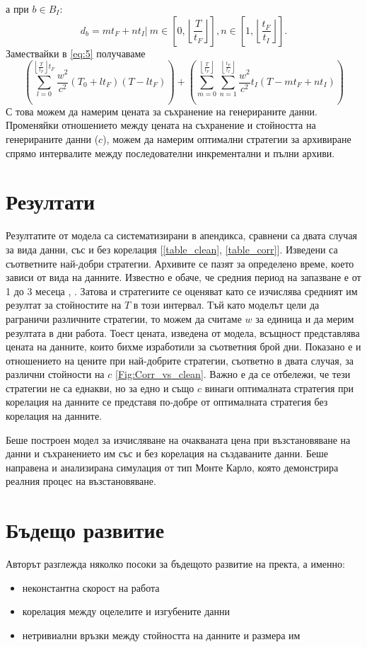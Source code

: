 \documentclass[11pt, a4paper]{article}
\theoremstyle{definition}
\begin{document}
			а при $b\in  B_I$:
			$$d_b= mt_F + nt_I|\ m\in \left[0, \left\lfloor\dfrac{T}{t_F}\right\rfloor\right],n\in \left[1, \left\lfloor\dfrac{t_F}{t_I}\right\rfloor\right].$$
			Замествайки в \ref{eq:5} получаваме
			\begin{equation}
				\left(\displaystyle\sum_{l = 0}^{\left\lfloor\frac{T}{t_F}\right\rfloor t_F}\dfrac{w^2}{c^2}(T_0 + lt_F)(T-lt_F)\right) + \left(\displaystyle\sum_{m = 0}^{\left\lfloor\frac{T}{t_F}\right\rfloor}\displaystyle\sum_{n = 1}^{\left\lfloor\frac{t_F}{t_I}\right\rfloor}\dfrac{w^2}{c^2}t_I(T-mt_F + nt_I)\right)
			\end{equation}
			С това можем да намерим цената за съхранение на генерираните данни. Променяйки отношението между цената на съхранение и стойността на генерираните данни ($c$), можем да намерим оптимални стратегии за архивиране спрямо интервалите между последователни инкрементални и пълни архиви.
	\section{Резултати}
			Резултатите от модела са систематизирани в апендикса, сравнени са двата случая за вида данни, със и без корелация [\ref{table_clean}, \ref{table_corr}]. Изведени са съответните най-добри стратегии. Архивите се пазят за определено време, което зависи от вида на данните. Известно е обаче, че средния период на запазване е от 1 до 3 месеца \cite{Gloukhovtsev}, \cite{Schepers}. Затова и стратегиите се оценяват като се изчислява средният им резултат за стойностите на $T$ в този интервал. Тъй като моделът цели да раграничи различните стратегии, то можем да считаме $w$ за единица и да мерим резултата в дни работа. Тоест цената, изведена от модела, всъщност представлява цената на данните, които бихме изработили за съответния брой дни. Показано е и отношението на цените при най-добрите стратегии, съответно в двата случая, за различни стойности на $c$ \ref{Fig:Corr_vs_clean}. Важно е да се отбележи, че тези стратегии не са еднакви, но за едно и също $c$ винаги оптималната стратегия при корелация на данните се представя по-добре от оптималната стратегия без корелация на данните.\par 
			Беше построен модел за изчисляване на очакваната цена при възстановяване на данни и съхранението им със и без корелация на създаваните данни. Беше направена и анализирана симулация от тип Монте Карло, която демонстрира реалния процес на възстановяване.
	\section{Бъдещо развитие}
		Авторът разглежда няколко посоки за бъдещото развитие на пректа, а именно:
		\begin{itemize}
			\item неконстантна скорост на работа 
			\item корелация между оцелелите и изгубените данни
			\item нетривиални връзки между стойността на данните и размера им
		\end{itemize}
\end{document}

